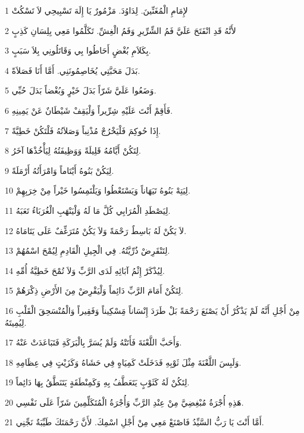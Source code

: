 \par 1 لإِمَامِ الْمُغَنِّينَ. لِدَاوُدَ. مَزْمُورٌ يَا إِلَهَ تَسْبِيحِي لاَ تَسْكُتْ
\par 2 لأَنَّهُ قَدِ انْفَتَحَ عَلَيَّ فَمُ الشِّرِّيرِ وَفَمُ الْغِشِّ. تَكَلَّمُوا مَعِي بِلِسَانِ كَذِبٍ
\par 3 بِكَلاَمِ بُغْضٍ أَحَاطُوا بِي وَقَاتَلُونِي بِلاَ سَبَبٍ.
\par 4 بَدَلَ مَحَبَّتِي يُخَاصِمُونَنِي. أَمَّا أَنَا فَصَلاَةً.
\par 5 وَضَعُوا عَلَيَّ شَرّاً بَدَلَ خَيْرٍ وَبُغْضاً بَدَلَ حُبِّي.
\par 6 فَأَقِمْ أَنْتَ عَلَيْهِ شِرِّيراً وَلْيَقِفْ شَيْطَانٌ عَنْ يَمِينِهِ.
\par 7 إِذَا حُوكِمَ فَلْيَخْرُجْ مُذْنِباً وَصَلاَتُهُ فَلْتَكُنْ خَطِيَّةً.
\par 8 لِتَكُنْ أَيَّامُهُ قَلِيلَةً وَوَظِيفَتُهُ لِيَأْخُذْهَا آخَرُ.
\par 9 لِيَكُنْ بَنُوهُ أَيْتَاماً وَامْرَأَتُهُ أَرْمَلَةً.
\par 10 لِيَتِهْ بَنُوهُ تَيَهَاناً وَيَسْتَعْطُوا وَيَلْتَمِسُوا خَيْراً مِنْ خِرَبِهِمْ.
\par 11 لِيَصْطَدِ الْمُرَابِي كُلَّ مَا لَهُ وَلْيَنْهَبِ الْغُرَبَاءُ تَعَبَهُ.
\par 12 لاَ يَكُنْ لَهُ بَاسِطٌ رَحْمَةً وَلاَ يَكُنْ مُتَرَغِّفٌ عَلَى يَتَامَاهُ.
\par 13 لِتَنْقَرِضْ ذُرِّيَّتُهُ. فِي الْجِيلِ الْقَادِمِ لِيُمْحَ اسْمُهُمْ.
\par 14 لِيُذْكَرْ إِثْمُ آبَائِهِ لَدَى الرَّبِّ وَلاَ تُمْحَ خَطِيَّةُ أُمِّهِ.
\par 15 لِتَكُنْ أَمَامَ الرَّبِّ دَائِماً وَلْيَقْرِضْ مِنَ الأَرْضِ ذِكْرَهُمْ.
\par 16 مِنْ أَجْلِ أَنَّهُ لَمْ يَذْكُرْ أَنْ يَصْنَعَ رَحْمَةً بَلْ طَرَدَ إِنْسَاناً مَِسْكِيناً وَفَقِيراً وَالْمُنْسَحِقَ الْقَلْبِ لِيُمِيتَهُ.
\par 17 وَأَحَبَّ اللَّعْنَةَ فَأَتَتْهُ وَلَمْ يُسَرَّ بِالْبَرَكَةِ فَتَبَاعَدَتْ عَنْهُ.
\par 18 وَلَبِسَ اللَّعْنَةَ مِثْلَ ثَوْبِهِ فَدَخَلَتْ كَمِيَاهٍ فِي حَشَاهُ وَكَزَيْتٍ فِي عِظَامِهِ.
\par 19 لِتَكُنْ لَهُ كَثَوْبٍ يَتَعَطَّفُ بِهِ وَكَمِنْطَقَةٍ يَتَنَطَّقُ بِهَا دَائِماً.
\par 20 هَذِهِ أُجْرَةُ مُبْغِضِيَّ مِنْ عِنْدِ الرَّبِّ وَأُجْرَةُ الْمُتَكَلِّمِينَ شَرّاً عَلَى نَفْسِي.
\par 21 أَمَّا أَنْتَ يَا رَبُّ السَّيِّدُ فَاصْنَعْ مَعِي مِنْ أَجْلِ اسْمِكَ. لأَنَّ رَحْمَتَكَ طَيِّبَةٌ نَجِّنِي.
